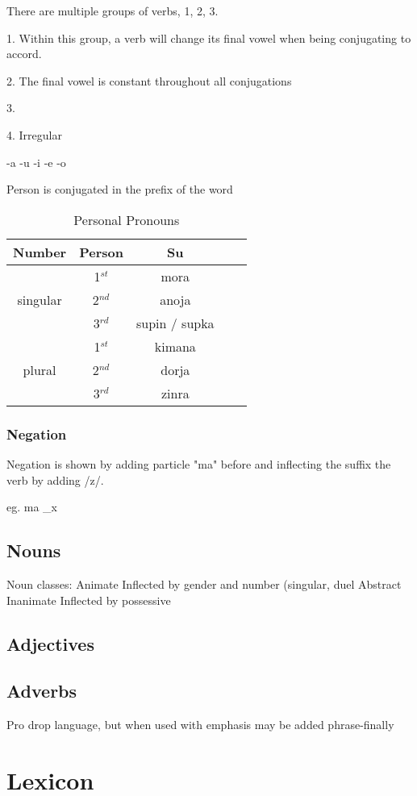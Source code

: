 \documentclass{article}
\begin{document}
    There are multiple groups of verbs, 1, 2, 3.

    1. Within this group, a verb will change its final vowel when being conjugating to accord.
    
    2. The final vowel is constant throughout all conjugations
    
    3.  

    4. Irregular


    -a 
    -u
    -i
    -e
    -o 

    Person is conjugated in the prefix of the word


          \begin{table}[htp]
     \centering
               \begin{tabular}{c|c|ccc}
                   \toprule
                   Number & Person & Su \\ \midrule
                   & 1$^{st}$ & mora \\
                   singular & 2$^{nd}$ & anoja \\
                   & 3$^{rd}$ & supin / supka \\ \midrule
                    & 1$^{st}$ & kimana \\          
                    plural & 2$^{nd}$ & dorja \\                     
                    & 3$^{rd}$ & zinra \\ 
                   \bottomrule  
               \end{tabular}
        \caption{Personal Pronouns} 
          \end{table} 


    \subsubsection{Negation}

    Negation is shown by adding particle "ma" before and inflecting the suffix the verb by adding /z/.

    eg. ma \_x

    \subsection{Nouns}

    Noun classes:
        Animate
            Inflected by gender and number (singular, duel 
        Abstract
        Inanimate
            Inflected by possessive

    \subsection{Adjectives}
    \subsection{Adverbs}
    Pro drop language, but when used with emphasis may be added phrase-finally

    \newpage
    \section{Lexicon}


   \newpage 
   \listoffigures
\listoftables
\end{document}

